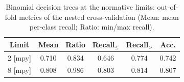 \begin{table}[htb!]
\centering
\footnotesize
\setlength{\tabcolsep}{4pt}
\caption{Binomial decision trees at the normative limits: out-of-fold metrics of the nested cross-validation (Mean: mean per-class recall; Ratio: min/max recall).}
\label{tab:trees}
\begin{tabular}{@{}cccccc@{}}
\toprule
Limit & Mean & Ratio & Recall$_{\leq}$ & Recall$_{>}$ & Acc. \\
\midrule
\midrule
2 [mpy] & 0.710 & 0.834 & 0.646 & 0.774 & 0.742 \\
8 [mpy] & 0.808 & 0.986 & 0.803 & 0.814 & 0.807 \\
\bottomrule
\end{tabular}
\end{table}
